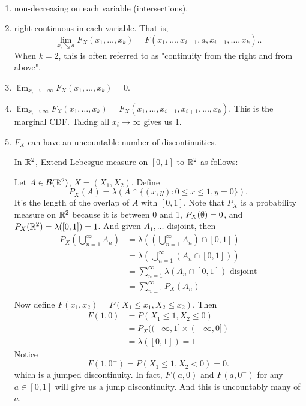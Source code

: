 \documentclass[class=article,crop=false]{standalone}
\begin{document}
\begin{property}
~\begin{enumerate}[label=\arabic*)]
	\item non-decreasing on each variable (intersections).
	\item right-continuous in each variable. That is,
		\[
			\lim_{ x_i \searrow a} F_X(x_1,\ldots,x_k) = F(x_1,\ldots,x_{i-1},a,x_{i+1},\ldots,x_k).
		.\] 
		When $ k=2$, this is often referred to as "continuity from the right and from above".
	\item $ \lim_{ x_i \to -\infty} F_X(x_1,\ldots,x_k) =0$.
	\item $ \lim_{ x_i \to \infty} F_X(x_1,\ldots,x_k) = F_X(x_1,\ldots,x_{i-1},x_{i+1},\ldots,x_k)$. This is the marginal CDF. Taking all $ x_i \to \infty$ gives us 1.
	\item $ F_X$ can have an uncountable number of discontinuities.
		 \begin{eg}[]
			 In $ \mathbb{R}^2$, Extend Lebesgue measure on $ [0,1]$ to  $ \mathbb{R}^2$ as follows:

			 Let $ A \in \mathcal{B}(\mathbb{R}^2)$, $ X=(X_1,X_2)$. Define
			 \[
				 P_X(A) = \lambda(A \cap \{(x,y): 0\leq x \leq 1, y=0\} )
			 .\] 
			 It's the length of the overlap of $ A$ with $ [0,1]$. Note that $ P_X$ is a probability measure on  $ \mathbb{R}^2$ because it is between 0 and 1, $ P_X( \emptyset) =0$, and $ P_X(\mathbb{R}^2)=\lambda([0,1])=1$. And given $ A_1,\ldots$ disjoint, then
			  \begin{align*}
				  P_X\left( \bigcup_{ n =1}^{\infty} A_n \right) &= \lambda \left( \left( \bigcup_{ n =1}^{\infty} A_n \right) \cap [0,1]  \right)  \\
										 &= \lambda\left( \bigcup_{ n =1}^{\infty} (A_n \cap [0,1]) \right)  \\
										 &= \sum_{ n= 1}^{\infty} \lambda(A_n \cap [0,1]) \text{ disjoint} \\
										 &= \sum_{ n= 1}^{\infty} P_X(A_n) \\
			  \end{align*}
			  Now define $ F(x_1,x_2) = P(X_1\leq x_1, X_2\leq x_2)$. Then
			   \begin{align*}
				   F(1,0) &= P(X_1\leq 1, X_2 \leq 0) \\
					  &= P_X((-\infty,1] \times (-\infty,0]) \\
					  &= \lambda ([0,1]) =1
			  \end{align*}
			  Notice
			  \[
				  F(1,0^-)= P(X_1\leq 1, X_2 < 0) = 0
			  .\] 
			  which is a jumped discontinuity. In fact, $ F(a,0)$ and  $ F(a,0^-)$ for any  $ a \in[0,1]$ will give us a jump discontinuity. And this is uncountably many of $ a$. 
		\end{eg}


\end{enumerate}
\end{property}
\end{document}
